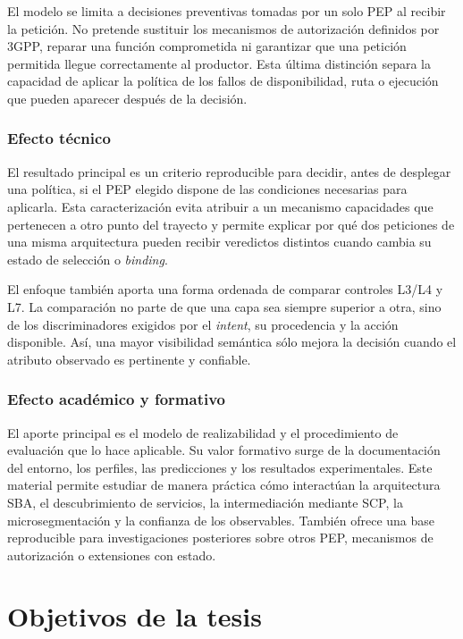 El modelo se limita a decisiones preventivas tomadas por un solo PEP al recibir la petición. No pretende sustituir los mecanismos de autorización definidos por 3GPP, reparar una función comprometida ni garantizar que una petición permitida llegue correctamente al productor. Esta última distinción separa la capacidad de aplicar la política de los fallos de disponibilidad, ruta o ejecución que pueden aparecer después de la decisión.

\subsubsection*{Efecto técnico}

El resultado principal es un criterio reproducible para decidir, antes de desplegar una política, si el PEP elegido dispone de las condiciones necesarias para aplicarla. Esta caracterización evita atribuir a un mecanismo capacidades que pertenecen a otro punto del trayecto y permite explicar por qué dos peticiones de una misma arquitectura pueden recibir veredictos distintos cuando cambia su estado de selección o \textit{binding}.

El enfoque también aporta una forma ordenada de comparar controles L3/L4 y L7. La comparación no parte de que una capa sea siempre superior a otra, sino de los discriminadores exigidos por el \textit{intent}, su procedencia y la acción disponible. Así, una mayor visibilidad semántica sólo mejora la decisión cuando el atributo observado es pertinente y confiable.

\subsubsection*{Efecto académico y formativo}

El aporte principal es el modelo de realizabilidad y el procedimiento de evaluación que lo hace aplicable. Su valor formativo surge de la documentación del entorno, los perfiles, las predicciones y los resultados experimentales. Este material permite estudiar de manera práctica cómo interactúan la arquitectura SBA, el descubrimiento de servicios, la intermediación mediante SCP, la microsegmentación y la confianza de los observables. También ofrece una base reproducible para investigaciones posteriores sobre otros PEP, mecanismos de autorización o extensiones con estado.

\section{Objetivos de la tesis}
\label{sec:objetivos-cap1}

